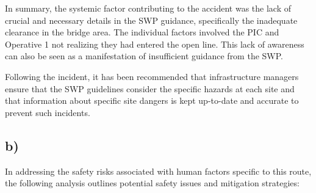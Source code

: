 \documentclass[letterpaper,12pt,leqno]{article}
\begin{document}
In summary, the systemic factor contributing to the accident was the lack of crucial and necessary details in the SWP guidance, specifically the inadequate clearance in the bridge area. The individual factors involved the PIC and Operative 1 not realizing they had entered the open line. This lack of awareness can also be seen as a manifestation of insufficient guidance from the SWP.

Following the incident, it has been recommended that infrastructure managers ensure that the SWP guidelines consider the specific hazards at each site and that information about specific site dangers is kept up-to-date and accurate to prevent such incidents.

\subsection{b)}
In addressing the safety risks associated with human factors specific to this route, the following analysis outlines potential safety issues and mitigation strategies:
\end{document}
